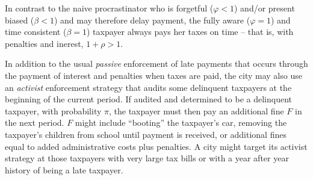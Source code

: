 In contrast to the naive procrastinator who is forgetful ($\varphi
<1$) and/or present biased ($\beta < 1$) and may therefore delay
payment, the fully aware ($\varphi= 1$) and time consistent ($\beta =
1$) taxpayer always pays her taxes on time -- that is, with penalties and inerest, $1 + \rho >
1$.

In addition to the usual \textit{passive} enforcement of late payments
that occurs through the payment of interest and penalties when taxes
are paid, the city may also use an \textit{activist} enforcement
strategy that audits some delinquent taxpayers at the beginning of the
current period. If audited and determined to be a delinquent taxpayer, with
probability $\pi$, the taxpayer must then pay an additional fine $F$
in the next period.  $F$ might include ``booting'' the taxpayer's car,
removing the taxpayer's children from school until payment is
received, or additional fines equal to added administrative costs plus
penalties.  A city might target its activist strategy at those
taxpayers with very large tax bills or with a year after year history of being a late taxpayer.

